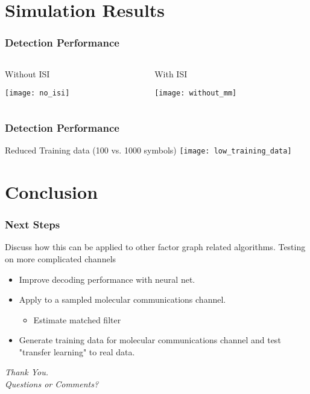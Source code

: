 \documentclass[10pt,tgadventor, onlymath]{beamer}
\begin{document}
\section{Simulation Results}

\begin{frame}
\frametitle{Detection Performance}
\begin{columns}
\begin{column}{0.5\linewidth}
	Without ISI

	\texttt{[image: no\_isi]}
\end{column}
\begin{column}{0.5\linewidth}
	With ISI

	\texttt{[image: without\_mm]}

\end{column}
\end{columns}
\end{frame}

\begin{frame}
\frametitle{Detection Performance}
	Reduced Training data (100 vs. 1000 symbols)
	\texttt{[image: low\_training\_data]}
\end{frame}


\section{Conclusion}


\begin{frame}
\frametitle{Next Steps}
Discuss how this can be applied to other factor graph related algorithms. 
Testing on more complicated channels
\begin{itemize}
\item Improve decoding performance with neural net.
\item Apply to a sampled molecular communications channel.
\begin{itemize}
\item Estimate matched filter
\end{itemize}
\item Generate training data for molecular communications channel and test "transfer learning" to real data.
\end{itemize}
\end{frame}

\begin{frame}
  \centering \Large
  \emph{Thank You.}
  \\
	\bigskip
    \centering \Large
  \emph{Questions or Comments?}

\end{frame}
\end{document}
